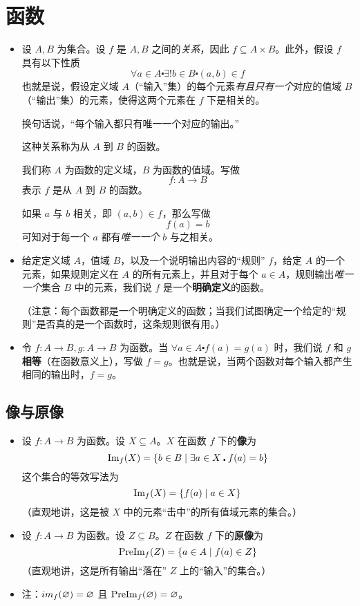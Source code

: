 \section{函数}

\begin{itemize}
    \item 设 $A,B$ 为集合。设 $f$ 是 $A, B$ 之间的\emph{关系}，因此 $f \subseteq A \times B$。此外，假设 $f$ 具有以下性质
          \[\forall a \in A \centerdot \exists! b \in B \centerdot (a, b) \in f\]
          也就是说，假设定义域 $A$（``输入''集）的每个元素\emph{有且只有一个}对应的值域 $B$（``输出''集）的元素，使得这两个元素在 $f$ 下是相关的。

          换句话说，``每个输入都只有唯一一个对应的输出。''

          这种关系称为从 $A$ 到 $B$ 的函数。

          我们称 $A$ 为函数的定义域，$B$ 为函数的值域。写做
          \[f:A \to B\]
          表示 $f$ 是从 $A$ 到 $B$ 的函数。

          如果 $a$ 与 $b$ 相关，即 $(a, b) \in f$，那么写做
          \[f(a) = b\]
          可知对于每一个 $a$ 都有\emph{唯一一个} $b$ 与之相关。
    \item 给定定义域 $A$，值域 $B$，以及一个说明输出内容的``规则'' $f$，给定 $A$ 的一个元素，如果规则定义在 $A$ 的所有元素上，并且对于每个 $a \in A$，规则输出\emph{唯一一个}集合 $B$ 中的元素，我们说 $f$ 是一个\textbf{明确定义}的函数。

          （注意：每个函数都是一个明确定义的函数；当我们试图确定一个给定的``规则''是否真的是一个函数时，这条规则很有用。）
    \item 令 $f : A \to B, g : A \to B$ 为函数。当 $\forall a \in A \centerdot f(a) = g(a)$ 时，我们说 $f$ 和 $g$ \textbf{相等}（在函数意义上），写做 $f = g$。也就是说，当两个函数对每个输入都产生相同的输出时，$f = g$。
\end{itemize}

\subsection{像与原像}

\begin{itemize}
    \item 设 $f : A \to B$ 为函数。设 $X \subseteq A$。$X$ 在函数 $f$ 下的\textbf{像}为
          \[\text{Im}_f (X) = \{b \in B \mid \exists a \in X \centerdot f(a) = b\}\]
          这个集合的等效写法为
          \[\text{Im}_f (X) = \{f(a) \mid a \in X\}\]
          （直观地讲，这是被 $X$ 中的元素``击中''的所有值域元素的集合。）
    \item 设 $f : A \to B$ 为函数。设 $Z \subseteq B$。$Z$ 在函数 $f$ 下的\textbf{原像}为
          \[\text{PreIm}_f (Z) = \{a \in A \mid f(a) \in Z\}\]
          （直观地讲，这是所有输出``落在'' $Z$ 上的``输入''的集合。）
    \item 注：$\\im_f (\varnothing) = \varnothing$ 且 $\text{PreIm}_f (\varnothing) = \varnothing$。
\end{itemize}

